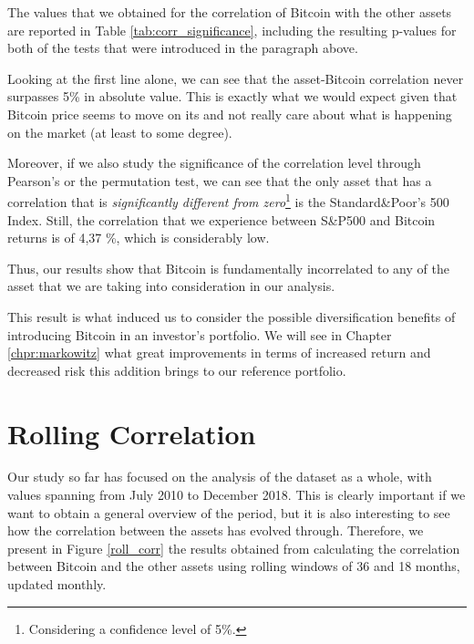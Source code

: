 The values that we obtained for the correlation of Bitcoin with the other assets are reported in Table \ref{tab:corr_significance}, including the resulting p-values for both of the tests that were introduced in the paragraph above.

Looking at the first line alone, we can see that the asset-Bitcoin correlation never surpasses 5\%  in absolute value. This is exactly what we would expect given that Bitcoin price seems to move on its and not really care about what is happening on the market (at least to some degree). 

Moreover, if we also study the significance of the correlation level through Pearson's or the permutation test, we can see that the only asset that has a correlation that is \textit{significantly different from zero}\footnote{Considering a confidence level of 5\%.} is the Standard\&Poor's 500 Index. Still, the correlation that we experience between S\&P500 and Bitcoin returns is of 4,37 \%, which is considerably low. 

Thus, our results show that Bitcoin is fundamentally incorrelated to any of the asset that we are taking into consideration in our analysis.

This result is what induced us to consider the possible diversification benefits of introducing  Bitcoin in an investor's portfolio. 
We will see in Chapter \ref{chpr:markowitz} what great improvements in terms of increased return and  decreased risk this addition brings to our reference portfolio. 





 \bigskip
\section{Rolling Correlation}
\label{sec:rolling_cor}
Our study so far has focused on the analysis of the dataset as a whole, with values spanning from  July 2010 to December 2018. This is clearly  important if we want to obtain a general overview of the period, but it is also interesting to see how the correlation between the  assets has evolved through. 
Therefore, we present in Figure \ref{roll_corr} the results obtained from calculating the correlation between Bitcoin and the other assets using  rolling windows of 36 and 18 months, updated monthly.


